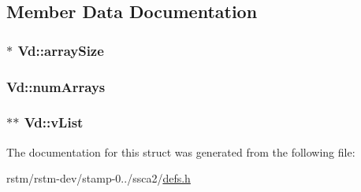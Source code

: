 \subsection{Member Data Documentation}
\hypertarget{structVd_a710ff388138def0b2113f3ca52aa77ba}{
\subsubsection[{array\-Size}]{$\ast$ Vd\-::array\-Size}}\label{structVd_a710ff388138def0b2113f3ca52aa77ba}
\hypertarget{structVd_ace6ffd4956a4f631621f7639f0d571b6}{
\subsubsection[{num\-Arrays}]{ Vd\-::num\-Arrays}}\label{structVd_ace6ffd4956a4f631621f7639f0d571b6}
\hypertarget{structVd_a19b892492f1414d3fc5017692476fb3f}{
\subsubsection[{v\-List}]{$\ast$$\ast$ Vd\-::v\-List}}\label{structVd_a19b892492f1414d3fc5017692476fb3f}


The documentation for this struct was generated from the following file\-:\begin{DoxyCompactItemize}
\item 
rstm/rstm-\/dev/stamp-\/0../ssca2/\hyperlink{defs_8h}{defs.\-h}\end{DoxyCompactItemize}
